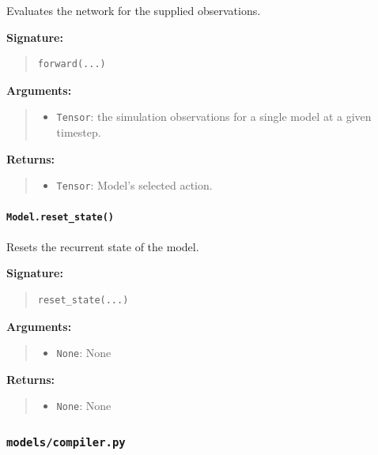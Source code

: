 \documentclass[11pt]{article}
\begin{document}
Evaluates the network for the supplied observations.

\textbf{Signature:}
\begin{quote}
\begin{verbatim}
forward(...)
\end{verbatim}
\end{quote}

\textbf{Arguments:}
\begin{quote}
\begin{itemize}
    \item \texttt{Tensor}: the simulation observations for a single model at a given timestep.
\end{itemize}
\end{quote}

\textbf{Returns:}
\begin{quote}
\begin{itemize}
    \item \texttt{Tensor}: Model's selected action.
\end{itemize}
\end{quote}

\paragraph{\texttt{Model.reset\_state()}}

Resets the recurrent state of the model.

\textbf{Signature:}
\begin{quote}
\begin{verbatim}
reset_state(...)
\end{verbatim}
\end{quote}

\textbf{Arguments:}
\begin{quote}
\begin{itemize}
    \item \texttt{None}: None
\end{itemize}
\end{quote}

\textbf{Returns:}
\begin{quote}
\begin{itemize}
    \item \texttt{None}: None
\end{itemize}
\end{quote}

\subsubsection{\texttt{models/compiler.py}}
\end{document}
